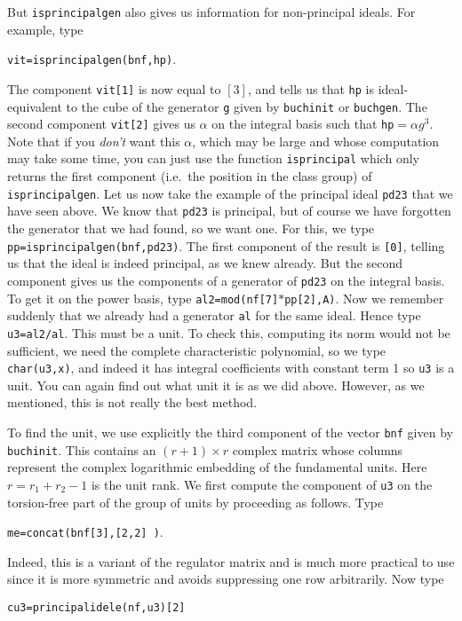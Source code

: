 But {\tt isprincipalgen} also gives us information for non-principal ideals.
For example, type 

{\tt vit=isprincipalgen(bnf,hp)}.

The component {\tt vit[1]}
is now equal to $[3]$, and tells us that {\tt hp} is ideal-equivalent to
the cube of the generator {\tt g} given by {\tt buchinit} or 
{\tt buchgen}.
The second component {\tt vit[2]} gives us $\alpha$ on the integral basis
such that {\tt hp$=\alpha g^3$}. Note that if you {\it don't\/} want this
$\alpha$, which may be large and whose computation may take some time, you
can just use the function {\tt isprincipal} which only returns the first
component (i.e.~the position in the class group) of {\tt isprincipalgen}.
\smallskip
Let us now take the example of the principal ideal {\tt pd23} that we have 
seen above. We know that {\tt pd23} is principal, but of course we have
forgotten the generator that we had found, so we want one. For this,
we type {\tt pp=isprincipalgen(bnf,pd23)}. The first component of the result is
{\tt [0]}, telling us that the ideal is indeed principal, as we knew already. 
But the second component gives us the components of a generator of {\tt pd23}
on the integral basis. To get it on the power basis, type
{\tt al2=mod(nf[7]$*$pp[2],A)}. Now we remember suddenly that we already
had a generator {\tt al} for the same ideal. Hence type {\tt u3=al2/al}.
This must be a unit. To check this, computing its norm would not be
sufficient, we need the complete characteristic polynomial, so we type
{\tt char(u3,x)}, and indeed it has integral coefficients with constant term 1
so {\tt u3} is a unit. You can again find out what unit it is as we did above.
However, as we mentioned, this is not really the best method.

To find the unit, we use explicitly the third component of the vector 
{\tt bnf} given by {\tt buchinit}. This contains an $(r+1)\times r$ complex
matrix whose columns represent the complex logarithmic embedding of the
fundamental units. Here $r=r_1+r_2-1$ is the unit rank. We first compute
the component of {\tt u3} on the torsion-free part of the group of units
by proceeding as follows. Type

{\tt me=concat(bnf[3],[2,2]~)}.

Indeed, this is a variant of the regulator
matrix and is much more practical to use since it is more symmetric and
avoids suppressing one row arbitrarily. Now type

{\tt cu3=principalidele(nf,u3)[2]} 

